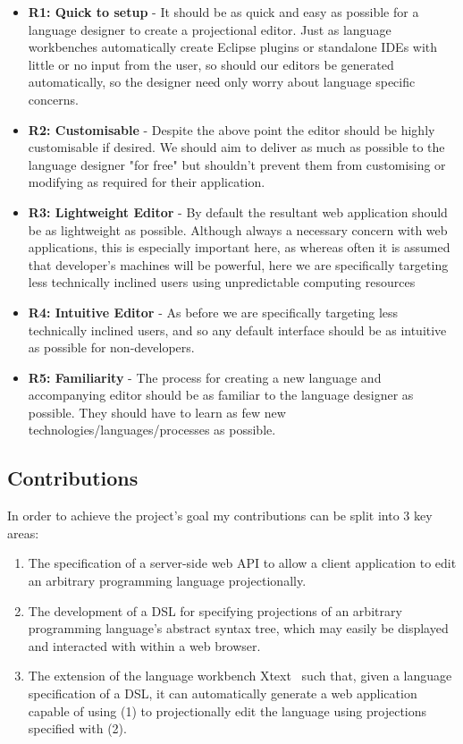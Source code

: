 \documentclass{article}
\begin{document}
\begin{itemize}
\item{\textbf{R1: Quick to setup} - It should be as quick and easy as possible for a language designer to create a projectional editor. Just as language workbenches automatically create Eclipse plugins or standalone IDEs with little or no input from the user, so should our editors be generated automatically, so the designer need only worry about language specific concerns.}
\item{\textbf{R2: Customisable} - Despite the above point the editor should be highly customisable if desired. We should aim to deliver as much as possible to the language designer "for free" but shouldn't prevent them from customising or modifying as required for their application. }
\item{\textbf{R3: Lightweight Editor} - By default the resultant web application should be as lightweight as possible. Although always a necessary concern with web applications, this is especially important here, as whereas often it is assumed that developer's machines will be powerful, here we are specifically targeting less technically inclined users using unpredictable computing resources}
\item{\textbf{R4: Intuitive Editor} - As before we are specifically targeting less technically inclined users, and so any default interface should be as intuitive as possible for non-developers.}
\item{\textbf{R5: Familiarity} - The process for creating a new language and accompanying editor should be as familiar to the language designer as possible. They should have to learn as few new technologies/languages/processes as possible.}
\end{itemize}

\subsection{Contributions}

In order to achieve the project's goal my contributions can be split into 3 key areas:

\begin{enumerate}
\item The specification of a server-side web API to allow a client application to edit an arbitrary programming language projectionally.
\item The development of a DSL for specifying projections of an arbitrary programming language's abstract syntax tree, which may easily be displayed and interacted with within a web browser.
\item The extension of the language workbench Xtext~\cite{xtext} such that, given a language specification of a DSL, it can automatically generate a web application capable of using (1) to projectionally edit the language using projections specified with (2).
\end{enumerate}
\end{document}
